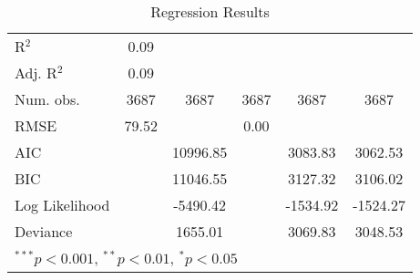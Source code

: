 \begin{table}
\begin{center}
\begin{tabular}{l c c c c c }
\hline
R$^2$                        & 0.09             &               &          &               &               \\
Adj. R$^2$                   & 0.09             &               &          &               &               \\
Num. obs.                    & 3687             & 3687          & 3687     & 3687          & 3687          \\
RMSE                         & 79.52            &               & 0.00     &               &               \\
AIC                          &                  & 10996.85      &          & 3083.83       & 3062.53       \\
BIC                          &                  & 11046.55      &          & 3127.32       & 3106.02       \\
Log Likelihood               &                  & -5490.42      &          & -1534.92      & -1524.27      \\
Deviance                     &                  & 1655.01       &          & 3069.83       & 3048.53       \\
\hline
\multicolumn{6}{l}{\scriptsize{$^{***}p<0.001$, $^{**}p<0.01$, $^*p<0.05$}}
\end{tabular}
\caption{Regression Results}
\label{table:coefficients}
\end{center}
\end{table}
